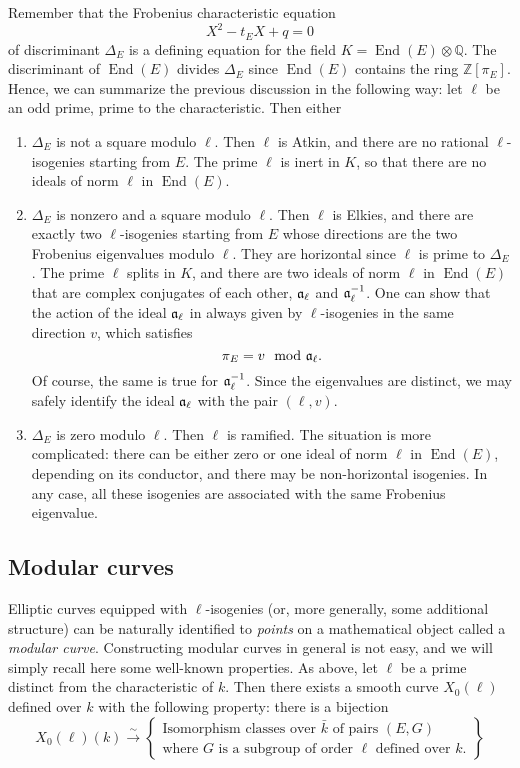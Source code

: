 \documentclass{article}
\newcommand{\Q}{\mathbb{Q}}
\newcommand{\Z}{\mathbb{Z}}
\newcommand{\isom}{\overset{\sim}{\longrightarrow}}
\newcommand{\set}[1]{\left\{#1\right\}}
\DeclareMathOperator{\End}{End}
\begin{document}
Remember that the Frobenius characteristic equation
\[
X^2 - t_E X + q = 0
\]
of discriminant $\Delta_E$ is a defining equation for the field $K = \End(E)
\otimes\Q$. The discriminant of $\End(E)$ divides $\Delta_E$ since $\End(E)$ 
contains the ring $\Z[\pi_E]$. Hence, we can summarize the previous discussion 
in the following way: let $\ell$ be an odd prime, prime to the characteristic. 
Then either
\begin{enumerate}
\item $\Delta_E$ is not a square modulo $\ell$. Then $\ell$ is Atkin, and there 
are no rational $\ell$-isogenies starting from $E$. The prime $\ell$ is inert 
in $K$, so that there are no ideals of norm $\ell$ in $\End(E)$.
\item $\Delta_E$ is nonzero and a square modulo $\ell$. Then $\ell$ is Elkies, 
and there are exactly two $\ell$-isogenies starting from $E$ whose directions 
are the two Frobenius eigenvalues modulo $\ell$. They are horizontal since $\ell
$ is prime to $\Delta_E$. The prime $\ell$ splits in $K$, and there are two 
ideals of norm $\ell$ in $\End(E)$ that are complex conjugates of each other, $
\frak a_\ell$ and $\frak a_\ell^{-1}$. One can show that the action of the 
ideal $\frak a_\ell$ in always given by $\ell$-isogenies in the same direction $
v$, which satisfies
\[
\pi_E = v \mod \frak a_\ell.
\]
Of course, the same is true for $\frak a_\ell^{-1}$. Since the eigenvalues are 
distinct, we may safely identify the ideal $\frak a_\ell$ with the pair $(\ell, 
v)$.
\item $\Delta_E$ is zero modulo $\ell$. Then $\ell$ is ramified. The situation 
is more complicated: there can be either zero or one ideal of norm $\ell$ in $
\End(E)$, depending on its conductor, and there may be non-horizontal 
isogenies. In any case, all these isogenies are associated with the same 
Frobenius eigenvalue.

\end{enumerate}


\subsection{Modular curves}

Elliptic curves equipped with $\ell$-isogenies (or, more generally, some 
additional structure) can be naturally identified to \emph{points} on a 
mathematical object called a \emph{modular curve}. Constructing modular curves 
in general is not easy, and we will simply recall here some well-known 
properties. As above, let $\ell$ be a prime distinct from the characteristic of 
$k$. 
Then there exists a smooth curve $X_0(\ell)$ defined over $k$ with the 
following property: there is a bijection
\[
X_0(\ell)(k) \isom \set{
\begin{matrix}
\text{Isomorphism classes over $\bar{k}$ of pairs $(E, G)$}\\
\text{where $G$ is a subgroup of order $\ell$ defined over $k$.}
\end{matrix}
}
\]
\end{document}
